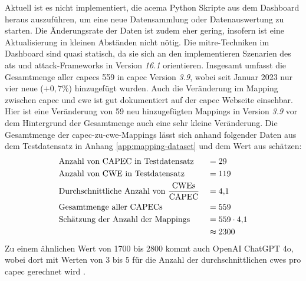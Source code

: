 \par Aktuell ist es nicht implementiert, die \gls{acema} Python Skripte aus dem Dashboard heraus auszuführen, um eine neue Datensammlung oder Datenauswertung zu starten. Die Änderungsrate der Daten ist zudem eher gering, insofern ist eine Aktualisierung in kleinen Abständen nicht nötig. Die \gls{mitre}-Techniken im Dashboard sind quasi statisch, da sie sich an den implementieren Szenarien des \glspl{at} und \gls{attack}-Frameworks in Version \textit{16.1} orientieren. Insgesamt umfasst die Gesamtmenge aller \glspl{capec} 559 in \gls{capec} Version \textit{3.9}, wobei seit Januar 2023 nur vier neue (\(+0{,}7\%\)) hinzugefügt wurden. Auch die Veränderung im Mapping zwischen \gls{capec} und \gls{cwe} ist gut dokumentiert auf der \gls{capec} Webseite einsehbar. Hier ist eine Veränderung von 59 neu hinzugefügten Mappings in Version \textit{3.9} vor dem Hintergrund der Gesamtmenge auch eine sehr kleine Veränderung. Die Gesamtmenge der \gls{capec}-zu-\gls{cwe}-Mappings lässt sich anhand folgender Daten aus dem Testdatensatz in Anhang \ref{app:mapping-dataset} und dem Wert aus \autocite{CAPECNewsEvents} schätzen:
\[
    \begin{alignedat}{2}
         & \text{Anzahl von CAPEC in Testdatensatz}                              & \quad & = 29             \\
         & \text{Anzahl von CWE in Testdatensatz}                                & \quad & = 119            \\
         & \text{Durchschnittliche Anzahl von } \frac{\text{CWEs}}{\text{CAPEC}} & \quad & =
        4{,}1                                                                                               \\
         & \text{Gesamtmenge aller CAPECs}                                       & \quad & = 559            \\
         & \text{Schätzung der Anzahl der Mappings}                              & \quad & =
        559 \cdot 4{,}1                                                                                     \\
         &                                                                       &       & \thickapprox2300 \\
    \end{alignedat}
\]
Zu einem ähnlichen Wert von 1700 bis 2800 kommt auch OpenAI ChatGPT 4o, wobei dort mit Werten von 3 bis 5 für die Anzahl der durchschnittlichen \glspl{cwe} pro \gls{capec} gerechnet wird \autocite{openaichatgpt4oCAPECCWEMapping2024}.

